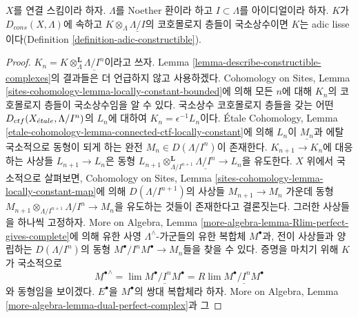 \begin{lemma}
\label{lemma-connected-adic-lisse}
$X$를 연결 스킴이라 하자. $\Lambda$를 Noether 환이라 하고
$I \subset \Lambda$를 아이디얼이라 하자. $K$가
$D_{cons}(X, \Lambda)$에 속하고
$K \otimes_\Lambda \underline{\Lambda/I}$의 코호몰로지 층들이
국소상수이면 $K$는 adic lisse이다(Definition
\ref{definition-adic-constructible}).
\end{lemma}

\begin{proof}
$K_n = K \otimes_\Lambda^\mathbf{L} \underline{\Lambda/I^n}$이라고
쓰자. Lemma \ref{lemma-describe-constructible-complexes}의 결과들은
더 언급하지 않고 사용하겠다. Cohomology on Sites, Lemma
\ref{sites-cohomology-lemma-locally-constant-bounded}에 의해 모든 $n$에
대해 $K_n$의 코호몰로지 층들이 국소상수임을 알 수 있다.
국소상수 코호몰로지 층들을 갖는 어떤
$D_{ctf}(X_{\acute{e}tale}, \Lambda/I^n)$의 $L_n$에 대하여
$K_n = \epsilon^{-1}L_n$이다. \'Etale Cohomology, Lemma
\ref{etale-cohomology-lemma-connected-ctf-locally-constant}에 의해
$L_n$이 $\underline{M_n}$과 에탈 국소적으로 동형이 되게 하는 완전
$M_n \in D(\Lambda/I^n)$이 존재한다. $K_{n + 1} \to K_n$에 대응하는
사상들 $L_{n + 1} \to L_n$은 동형
$L_{n + 1} \otimes_{\Lambda/I^{n + 1}}^\mathbf{L}
\underline{\Lambda/I^n} \to L_n$을 유도한다. $X$ 위에서 국소적으로
살펴보면, Cohomology on Sites, Lemma
\ref{sites-cohomology-lemma-locally-constant-map}에 의해
$D(\Lambda/I^{n + 1})$의 사상들 $M_{n + 1} \to M_n$ 가운데 동형
$M_{n + 1} \otimes_{\Lambda/I^{n + 1}} \Lambda/I^n \to M_n$을 유도하는
것들이 존재한다고 결론짓는다. 그러한 사상들을 하나씩 고정하자.
More on Algebra, Lemma
\ref{more-algebra-lemma-Rlim-perfect-gives-complete}에 의해 유한 사영
$\Lambda^\wedge$-가군들의 유한 복합체 $M^\bullet$과, 전이 사상들과
양립하는 $D(\Lambda/I^n)$의 동형
$M^\bullet/I^nM^\bullet \to M_n$들을 찾을 수 있다. 증명을 마치기 위해
$K$가 국소적으로
$$
\underline{M^\bullet}^\wedge =
\lim \underline{M^\bullet/I^nM^\bullet} =
R\lim \underline{M^\bullet/I^nM^\bullet}
$$
와 동형임을 보이겠다. $E^\bullet$을 $M^\bullet$의 쌍대 복합체라 하자.
More on Algebra, Lemma \ref{more-algebra-lemma-dual-perfect-complex}과 그

\end{proof}
